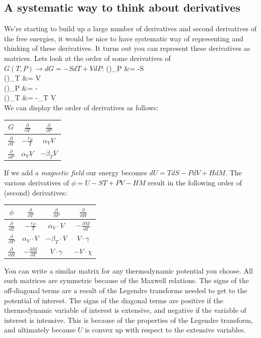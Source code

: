 \documentclass[12pt]{article}
\begin{document}
\subsection{A systematic way to think about derivatives} \label{systematicWayDerivatives}
We're starting to build up a large number of derivatives and second derivatives of the free energies, it would be nice to have systematic way of representing and thinking of these derivatives. It turns out you can represent these derivatives as matrices. Lets look at the order of some derivatives of $G(T,P) \rightarrow dG = -S dT + V dP$:
\eqs
\left(\right)_P &= -S\\
\left(\right)_T &= V\\
\left(\right)_P &= -\\
\left(\right)_T &= -\beta_T V\\
\eqe
We can display the order of derivatives as follows:\\
\begin{center}
\begin{tabular}{c | c | c}
 $G$ & $\frac{\partial}{\partial T}$ & $\frac{\partial}{\partial P}$\\ \hline
 $\frac{\partial}{\partial T}$ & $-\frac{c_P}{T}$ & $\alpha_V V$\\ \hline
 $\frac{\partial}{\partial P}$ & $\alpha_V V$ & $-\beta_T V$
\end{tabular}
\end{center}
If we add a \emph{magnetic field} our energy becomes $dU = TdS - PdV + H dM$.  The various derivatives of $\phi = U - ST + PV - HM$ result in the following order of (second) derivatives:
\begin{center}
\begin{tabular}{c | c | c | c}
$\phi$ & $\frac{\partial}{\partial T}$ & $\frac{\partial}{\partial P}$& $\frac{\partial}{\partial H}$\\ \hline
$\frac{\partial}{\partial T}$ & $-\frac{c_P}{T}$ & $\alpha_V \cdot V$ & $-\frac{\partial M}{\partial T}$\\ \hline
$\frac{\partial}{\partial P}$ & $\alpha_V \cdot V$ & $-\beta_T \cdot V$ & $V \cdot \gamma$\\ \hline
$\frac{\partial}{\partial H}$ & $-\frac{\partial M}{\partial T}$ & $V \cdot \gamma$ & $-V \cdot \chi$
\end{tabular}
\end{center}
You can write a similar matrix for any thermodynamic potential you choose. All such matrices are symmetric because of the Maxwell relations. The signs of the off-diagonal terms are a result of the Legendre transforms needed to get to the potential of interest. The signs of the diagonal terms are positive if the thermodynamic variable of interest is extensive, and negative if the variable of interest is intensive. This is because of the properties of the Legendre transform, and ultimately because $U$ is convex up with respect to the extensive variables.
\end{document}
